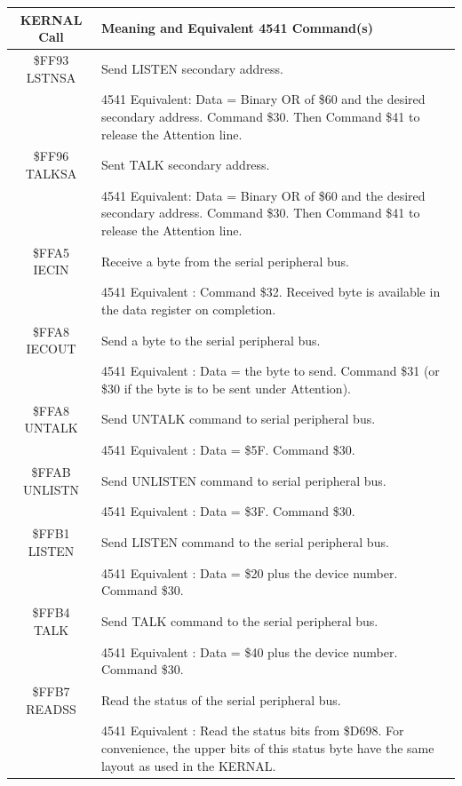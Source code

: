 \begin{center}
    \begin{longtable}{|c|L{8cm}|}
        \hline
        \textbf{KERNAL Call} & \textbf{Meaning and Equivalent 4541 Command(s)}\\
        \hline
        \endhead
        \$FF93 LSTNSA & Send LISTEN secondary address.  \\
         & 4541 Equivalent: Data = Binary OR of \$60 and the desired
        secondary address.  Command \$30. Then Command \$41 to release
        the Attention line. \\
        \hline
        \$FF96 TALKSA & Sent TALK secondary address.  \\
         & 4541 Equivalent: Data = Binary OR of \$60 and the desired
        secondary address.  Command \$30. Then Command \$41 to release
        the Attention line. \\
        \hline
        \$FFA5 IECIN & Receive a byte from the serial peripheral bus.  \\
         & 4541 Equivalent : Command \$32. Received byte is available
        in the data register on completion.  \\
        \hline
        \$FFA8 IECOUT & Send a byte to the serial peripheral bus.  \\
         & 4541 Equivalent : Data = the byte to send. Command \$31 (or \$30 if the byte is to
        be sent under Attention). \\
        \hline
        \$FFA8 UNTALK  & Send UNTALK command to serial peripheral bus.  \\
        & 4541 Equivalent : Data = \$5F. Command \$30. \\
        \hline
        \$FFAB UNLISTN  & Send UNLISTEN command to serial peripheral bus.  \\
        & 4541 Equivalent : Data = \$3F. Command \$30. \\
        \hline
        \$FFB1 LISTEN  & Send LISTEN command to the serial peripheral bus.  \\
        & 4541 Equivalent : Data = \$20 plus the device number. Command \$30. \\
        \hline
        \$FFB4 TALK  & Send TALK command to the serial peripheral bus.  \\
        & 4541 Equivalent : Data = \$40 plus the device number. Command \$30. \\
        \hline
        \$FFB7 READSS & Read the status of the serial peripheral bus.  \\
        & 4541 Equivalent : Read the status bits from \$D698. For
        convenience, the
        upper bits of this status byte have the same layout as used in
        the KERNAL. \\
        \hline
    \end{longtable}
\end{center}

